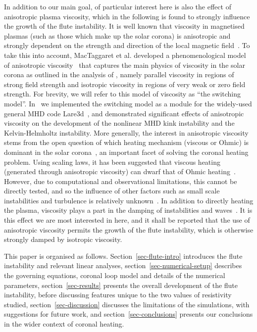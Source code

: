 \documentclass[fleqn,usenatbib]{mnras}
\begin{document}
In addition to our main goal, of particular interest here is
also the effect of anisotropic plasma viscosity, which in the following is found to
strongly influence the growth of the flute instability.
It is well known that viscosity in magnetised plasmas (such as
those which make up the solar corona) is
anisotropic and strongly dependent on the strength and direction of
the local magnetic
field~\citep{hollwegViscosityChewGoldbergerLowEquations1986,hollwegViscosityMagnetizedPlasma1985,braginskiiTransportProcessesPlasma1965}.
To take this into account, MacTaggaret et al. developed a phenomenological model of anisotropic viscosity~\citep{mactaggartBraginskiiMagnetohydrodynamicsArbitrary2017} that
captures the main physics of viscosity in the 
solar corona as outlined in the analysis of
\cite{braginskiiTransportProcessesPlasma1965}, namely parallel
viscosity in regions of strong field  strength and isotropic viscosity
in regions of very weak or zero field strength. For brevity, we will
refer to this model of viscosity as ``the switching model''. In~\citet{quinnEffectAnisotropicViscosity2020,quinnKelvinHelmholtzInstabilityCollapse2021} we implemented
the switching model as a module for the widely-used general MHD code
Lare3d~\citep{arberStaggeredGridLagrangian2001}, and demonstrated
significant effects of anisotropic viscosity on the 
development of the nonlinear MHD kink instability and the
Kelvin-Helmholtz instability. More generally, the interest in
anisotropic viscosity stems from the open question of
which heating mechanism (viscous or Ohmic) is dominant in the solar
corona~\citep{klimchukSolvingCoronalHeating2006}, an important facet
of solving the coronal heating problem. Using scaling laws, it has
been suggested that viscous heating (generated through anisotropic
viscosity) can dwarf that of Ohmic
heating~\citep{craigAnisotropicViscousDissipation2009a,litvinenkoViscousEnergyDissipation2005}.
However,
due to computational and observational limitations, this cannot be
directly tested, and so the influence of other factors such as small
scale instabilities and turbulence is relatively
unknown~\citet{klimchukSolvingCoronalHeating2006}. In addition to
directly heating the plasma, viscosity plays a part in the damping of
instabilities and waves~\citep{rudermanSlowSurfaceWave2000}. It is
this effect we are most interested in here, and it shall be reported that
the use of anisotropic viscosity permits the growth of the
flute instability, which is otherwise strongly damped by
isotropic viscosity. 

This paper is organised as follows. Section~\ref{sec-flute-intro} introduces the flute instability and relevant linear analyses, section~\ref{sec-numerical-setup} describes the governing equations, coronal loop model and details of the numerical parameters, section~\ref{sec-results} presents the overall development of the flute instability, before discussing features unique to the two values of resistivity studied, section~\ref{sec-discussion} discusses the limitations of the simulations, with suggestions for future work, and section~\ref{sec-conclusions} presents our conclusions in the wider context of coronal heating.
\end{document}
